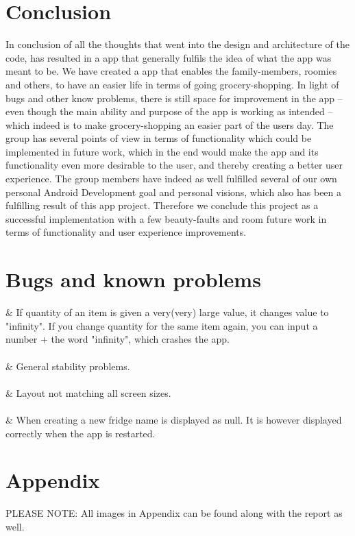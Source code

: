 \documentclass[12pt]{article}
\begin{document}
\section{Conclusion}
In conclusion of all the thoughts that went into the design and architecture of the code, has resulted in a app that generally fulfils the idea of what the app was meant to be. We have created a app that enables the family-members, roomies and others, to have an easier life in terms of going grocery-shopping. In light of bugs and other know problems, there is still space for improvement in the app – even though the main ability and purpose of the app is working as intended – which indeed is to make grocery-shopping an easier part of the users day. The group has several points of view in terms of functionality which could be implemented in future work, which in the end would make the app and its functionality even more desirable to the user, and thereby creating a better user experience. The group members have indeed as well fulfilled several of our own personal Android Development goal and personal visions, which also has been a fulfilling result of this app project. Therefore we conclude this project as a successful implementation with a few beauty-faults and room future work in terms of functionality and user experience improvements.

\section{Bugs and known problems}

\begin{easylist}
	& If quantity of an item is given a very(very) large value, it changes value to "infinity". If you change quantity for the same item again, you can input a number + the word "infinity", which crashes the app.
	\\
	\\	
	& General stability problems.
	\\
	\\
	& Layout not matching all screen sizes.
	\\
	\\
	& When creating a new fridge name is displayed as null. It is however displayed correctly when the app is restarted.
\end{easylist}

\pagebreak
\section{Appendix}
PLEASE NOTE: All images in Appendix can be found along with the report as well.
\end{document}
